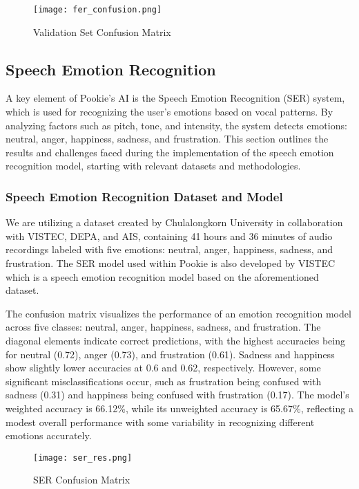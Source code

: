 \begin{figure}[!ht]
    \centering
    \captionsetup{justification=centering}
    \texttt{[image: fer\_confusion.png]}
    \caption{Validation Set Confusion Matrix}
    \label{fig:fer-con}
\end{figure}

\newpage
\subsection{Speech Emotion Recognition}
A key element of Pookie’s AI is the Speech Emotion Recognition (SER) system, which is used for recognizing the user’s emotions based on vocal patterns. By analyzing factors such as pitch, tone, and intensity, the system detects emotions: neutral, anger, happiness, sadness, and frustration. This section outlines the results and challenges faced during the implementation of the  speech emotion recognition model, starting with relevant datasets and methodologies.

\subsubsection{Speech Emotion Recognition Dataset and Model}
We are utilizing a dataset created by Chulalongkorn University in collaboration with VISTEC, DEPA, and AIS, containing 41 hours and 36 minutes of audio recordings labeled with five emotions: neutral, anger, happiness, sadness, and frustration.
The SER model used within Pookie is also developed by VISTEC which is a speech emotion recognition model based on the aforementioned dataset. 

The confusion matrix visualizes the performance of an emotion recognition model across five classes: neutral, anger, happiness, sadness, and frustration. The diagonal elements indicate correct predictions, with the highest accuracies being for neutral (0.72), anger (0.73), and frustration (0.61). Sadness and happiness show slightly lower accuracies at 0.6 and 0.62, respectively. However, some significant misclassifications occur, such as frustration being confused with sadness (0.31) and happiness being confused with frustration (0.17). The model's weighted accuracy is 66.12\%, while its unweighted accuracy is 65.67\%, reflecting a modest overall performance with some variability in recognizing different emotions accurately.

\begin{figure} [!htb]
    \centering
    \captionsetup{justification=centering}
    \texttt{[image: ser\_res.png]}
    \caption{SER Confusion Matrix}
    \label{fig:ser-con}
\end{figure}

